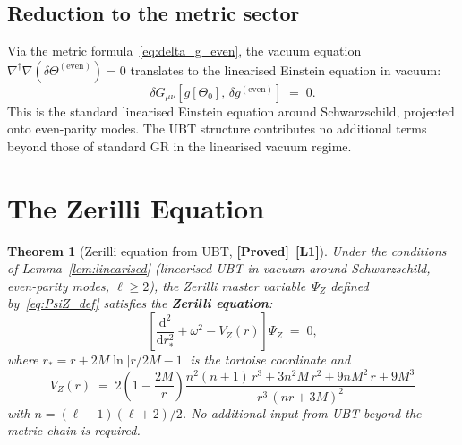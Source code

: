 \documentclass[12pt,a4paper]{article}
\newtheorem{theorem}{Theorem}[section]
\theoremstyle{definition}
\theoremstyle{remark}
\newcommand{\PROVED}{\textbf{[Proved]}}
\newcommand{\Lone}{\textbf{[L1]}}
\newcommand{\dd}{\mathrm{d}}
\begin{document}
\subsection{Reduction to the metric sector}

Via the metric formula~\eqref{eq:delta_g_even}, the vacuum equation
$\nabla^\dagger\nabla(\delta\Theta^{(\mathrm{even})}) = 0$ translates to
the linearised Einstein equation in vacuum:
\begin{equation}
\label{eq:lin_einstein}
  \delta G_{\mu\nu}[g[\Theta_0],\,\delta g^{(\mathrm{even})}] \;=\; 0.
\end{equation}
This is the standard linearised Einstein equation around Schwarzschild,
projected onto even-parity modes.  The UBT structure contributes
no additional terms beyond those of standard GR in the linearised vacuum regime.

\section{The Zerilli Equation}
\label{sec:zerilli}

\begin{theorem}[Zerilli equation from UBT, \PROVED\ \Lone]
\label{thm:zerilli}
Under the conditions of Lemma~\ref{lem:linearised} (linearised UBT in vacuum
around Schwarzschild, even-parity modes, $\ell \geq 2$), the Zerilli master
variable~$\Psi_Z$ defined by~\eqref{eq:PsiZ_def} satisfies the
\textbf{Zerilli equation}:
\begin{equation}
\label{eq:zerilli}
  \left[\frac{\dd^2}{\dd r_*^2} + \omega^2 - V_Z(r)\right]\Psi_Z \;=\; 0,
\end{equation}
where $r_* = r + 2M\ln|r/2M - 1|$ is the tortoise coordinate and
\begin{equation}
\label{eq:VZ}
  V_Z(r)
  \;=\;
  2\!\left(1 - \frac{2M}{r}\right)
  \frac{n^2(n+1)\,r^3 + 3n^2M\,r^2 + 9nM^2\,r + 9M^3}
       {r^3\,(nr + 3M)^2}
\end{equation}
with $n = (\ell-1)(\ell+2)/2$.
No additional input from UBT beyond the metric chain is required.
\end{theorem}
\end{document}
